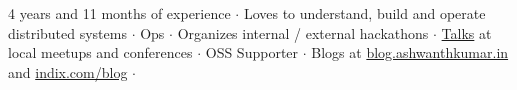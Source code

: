 

\begin{cvparagraph}
4 years and 11 months of experience ${\cdotp}$ Loves to understand, build and operate distributed systems ${\cdotp}$ Ops ${\cdotp}$ Organizes internal / external hackathons ${\cdotp}$ \href{https://speakerdeck.com/ashwanthkumar}{Talks} at local meetups and conferences ${\cdotp}$ OSS Supporter ${\cdotp}$ Blogs at \href{http://blog.ashwanthkumar.in/}{blog.ashwanthkumar.in} and \href{http://www.indix.com/blog/author/ashwanth/}{indix.com/blog} ${\cdotp}$ 
\end{cvparagraph}
